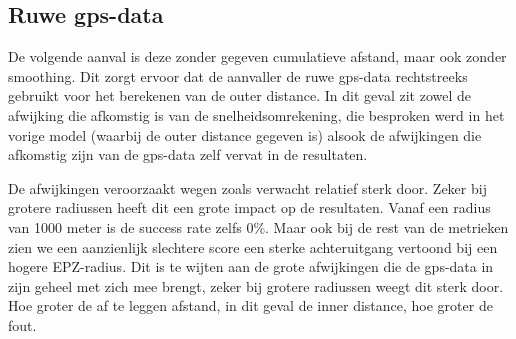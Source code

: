 \subsection{Ruwe gps-data}
De volgende aanval is deze zonder gegeven cumulatieve afstand, maar ook zonder
smoothing. Dit zorgt ervoor dat de aanvaller de ruwe \ac{gps}-data rechtstreeks
gebruikt voor het berekenen van de outer distance. In dit geval zit zowel de
afwijking die afkomstig is van de snelheidsomrekening, die besproken werd in
het vorige model (waarbij de outer distance gegeven is) alsook de afwijkingen
die afkomstig zijn van de \ac{gps}-data zelf vervat in de resultaten.

De afwijkingen veroorzaakt wegen zoals verwacht relatief sterk door. Zeker bij
grotere radiussen heeft dit een grote impact op de resultaten. Vanaf een radius
van 1000 meter is de success rate zelfs 0\%. Maar ook bij de rest van de
metrieken zien we een aanzienlijk slechtere score een sterke achteruitgang
vertoond bij een hogere \ac{EPZ}-radius. Dit is te wijten aan de grote
afwijkingen die de \ac{gps}-data in zijn geheel met zich mee brengt, zeker bij
grotere radiussen weegt dit sterk door. Hoe groter de af te leggen afstand, in
dit geval de inner distance, hoe groter de fout.
